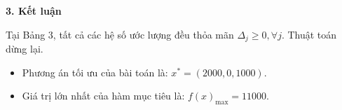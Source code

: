 \textbf{3. Kết luận}

Tại Bảng 3, tất cả các hệ số ước lượng đều thỏa mãn $\Delta_j \ge 0, \forall j$. Thuật toán dừng lại.
\begin{itemize}
    \item Phương án tối ưu của bài toán là: $x^* = (2000, 0, 1000)$.
    \item Giá trị lớn nhất của hàm mục tiêu là: $f(x)_{\max} = 11000$.
\end{itemize}